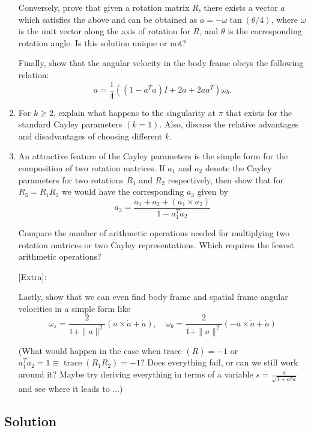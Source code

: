 \begin{enumerate}[label= (\alph*)]
          Conversely, prove that given a rotation matrix \( R \), there exists a vector \( a \) which satisfies the above and can be obtained as \( a=-\omega \tan (\theta / 4) \), where \( \omega \) is the unit vector along the axis of rotation for \( R \), and \( \theta \) is the corresponding rotation angle.
          Is this solution unique or not?

          Finally, show that the angular velocity in the body frame obeys the following relation:
          \[
              \dot{a}=\frac{1}{4}\left(\left(1-a^{T} a\right) I+2 \widehat{a}+2 a a^{T}\right) \omega_{b} .
          \]

    \item For \( k \geq 2 \), explain what happens to the singularity at \( \pi \) that exists for the standard Cayley parameters \( (k=1) \).
          Also, discuss the relative advantages and disadvantages of choosing different \( k \).

    \item An attractive feature of the Cayley parameters is the simple form for the composition of two rotation matrices.
          If \( a_{1} \) and \( a_{2} \) denote the Cayley parameters for two rotations \( R_{1} \) and \( R_{2} \) respectively, then show that for \( R_{3}=R_{1} R_{2} \) we would have the corresponding \( a_{3} \) given by
          \[
              a_{3}=\frac{a_{1}+a_{2}+\left(a_{1} \times a_{2}\right)}{1-a_{1}^{T} a_{2}}
          \]

          Compare the number of arithmetic operations needed for multiplying two rotation matrices or two Cayley representations.
          Which requires the fewest arithmetic operations?

          [Extra]:

          Lastly, show that we can even find body frame and spatial frame angular velocities in a simple form like
          \[
              \omega_{s}=\frac{2}{1+\|a\|^{2}}(a \times \dot{a}+\dot{a}), \quad \omega_{b}=\frac{2}{1+\|a\|^{2}}(-a \times \dot{a}+\dot{a})
          \]

          (What would happen in the case when trace \( (R)=-1 \) or \( a_{1}^{T} a_{2}=1 \equiv \operatorname{trace}\left(R_{1} R_{2}\right)=-1 \)?
          Does everything fail, or can we still work around it?
          Maybe try deriving everything in terms of a variable \( s=\frac{a}{\sqrt{1+a^{T} a}} \) and see where it leads to \( \ldots \))
\end{enumerate}

\subsection*{Solution}

